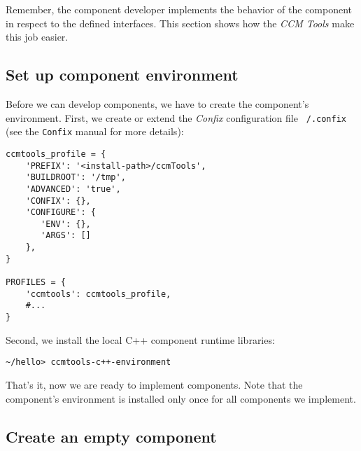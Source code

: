 Remember, the component developer implements the behavior of the component in
respect to the defined interfaces. This section shows how the {\it CCM Tools}
make this job easier.

\subsection{Set up component environment}

Before we can develop components, we have to create the component's environment.
First, we create or extend the {\it Confix} configuration file {\tt ~/.confix}
(see the {\tt Confix} manual for more details):
\begin{verbatim}
ccmtools_profile = {
    'PREFIX': '<install-path>/ccmTools',
    'BUILDROOT': '/tmp',
    'ADVANCED': 'true',
    'CONFIX': {},
    'CONFIGURE': {
       'ENV': {},
       'ARGS': []
    },
}
    
PROFILES = {
    'ccmtools': ccmtools_profile,
    #...
}
\end{verbatim}

\noindent
Second, we install the local C++ component runtime libraries:
\begin{verbatim}
~/hello> ccmtools-c++-environment
\end{verbatim}

\noindent
That's it, now we are ready to implement components.
Note that the component's environment is installed only once for all 
components we implement.


\subsection{Create an empty component}

